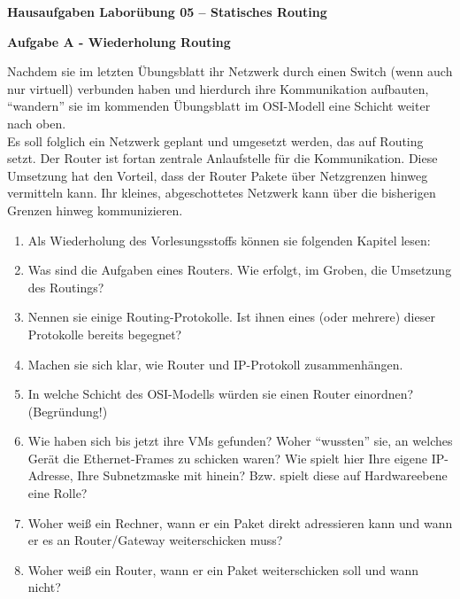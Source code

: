 \documentclass[paper=a4,fontsize=11pt]{scrartcl}%
\numberwithin{equation}{section}
\begin{document}
\begin{center}
\Large{\textbf{Hausaufgaben Laborübung 05 -- Statisches Routing}}
\end{center}
\begin{center}\Large{\textbf{Aufgabe A - Wiederholung Routing}}
\end{center}\vskip0.25in
Nachdem sie im letzten Übungsblatt ihr Netzwerk durch einen Switch (wenn auch nur virtuell) verbunden haben und hierdurch ihre Kommunikation aufbauten, \enquote{wandern} sie im kommenden Übungsblatt im OSI-Modell eine Schicht weiter nach oben.\\
Es soll folglich ein Netzwerk geplant und umgesetzt werden, das auf Routing setzt. Der Router ist fortan zentrale Anlaufstelle für die Kommunikation. Diese Umsetzung hat den Vorteil, dass der Router Pakete über Netzgrenzen hinweg vermitteln kann. Ihr kleines, abgeschottetes Netzwerk kann über die bisherigen Grenzen hinweg kommunizieren.
\begin{enumerate}
	\item Als Wiederholung des Vorlesungsstoffs können sie folgenden Kapitel lesen: \cite[Kap. 4.1, 4.3]{Kurose2012}
	\item Was sind die Aufgaben eines Routers. Wie erfolgt, im Groben, die Umsetzung des Routings?
	\item Nennen sie einige Routing-Protokolle. Ist ihnen eines (oder mehrere) dieser Protokolle bereits begegnet?
	\item Machen sie sich klar, wie Router und IP-Protokoll zusammenhängen.
	\item In welche Schicht des OSI-Modells würden sie einen Router einordnen? (Begründung!)
	\item Wie haben sich bis jetzt ihre VMs gefunden? Woher \enquote{wussten} sie, an welches Gerät die Ethernet-Frames zu schicken waren? Wie spielt hier Ihre eigene IP-Adresse, Ihre Subnetzmaske mit hinein? Bzw. spielt diese auf Hardwareebene eine Rolle?
	\item Woher weiß ein Rechner, wann er ein Paket direkt adressieren kann und wann er es an Router/Gateway weiterschicken muss?
	\item Woher weiß ein Router, wann er ein Paket weiterschicken soll und wann nicht?
\end{enumerate}
\end{document}
